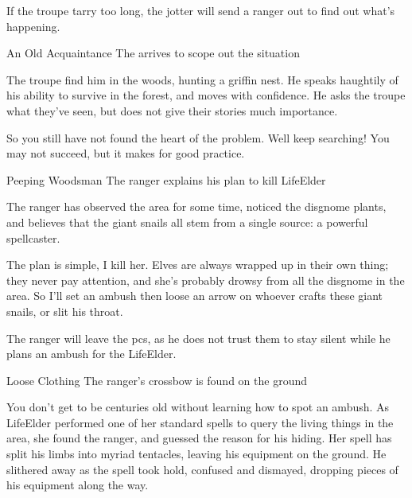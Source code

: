 If the troupe tarry too long, the \gls{jotter} will send a ranger out to find out what's happening.

{An Old Acquaintance}%
{The  arrives to scope out the situation}%

The troupe find him in the woods, hunting a griffin nest.
He speaks haughtily of his ability to survive in the forest, and moves with confidence.
He asks the troupe what they've seen, but does not give their stories much importance.

\begin{speechtext}
  So you still have not found the heart of the problem.
  Well keep searching!
  You may not succeed, but it makes for good practice.
\end{speechtext}

{Peeping Woodsman}%
{The ranger explains his plan to kill \gls{LifeElder}}%

The \gls{ranger} has observed the area for some time, noticed the \gls{disgnome} plants, and believes that the giant snails all stem from a single source: a powerful spellcaster.

\begin{speechtext}
  The plan is simple, I kill her.
  Elves are always wrapped up in their own thing; they never pay attention, and she's probably drowsy from all the \gls{disgnome} in the area.
  So I'll set an ambush then loose an arrow on whoever crafts these giant snails, or slit his throat.
\end{speechtext}

The \gls{ranger} will leave the \glspl{pc}, as he does not trust them to stay silent while he plans an ambush for the \gls{LifeElder}.

{Loose Clothing}%
{The ranger's crossbow is found on the ground}%

\begin{speechtext}
  You don't get to be centuries old without learning how to spot an ambush.
  As \gls{LifeElder} performed one of her standard spells to query the living things in the area, she found the ranger, and guessed the reason for his hiding.
  Her spell has split his limbs into myriad tentacles, leaving his equipment on the ground.
  He slithered away as the spell took hold, confused and dismayed, dropping pieces of his equipment along the way.
\end{speechtext}


